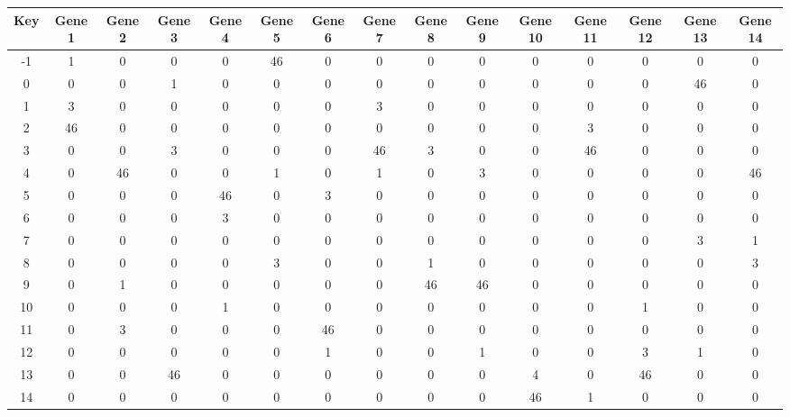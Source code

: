 \begin{tabular}{|c|c|c|c|c|c|c|c|c|c|c|c|c|c|c|}
\hline
Key & Gene 1 & Gene 2 & Gene 3 & Gene 4 & Gene 5 & Gene 6 & Gene 7 & Gene 8 & Gene 9 & Gene 10 & Gene 11 & Gene 12 & Gene 13 & Gene 14 \\
\hline
-1 & 1 & 0 & 0 & 0 & 46 & 0 & 0 & 0 & 0 & 0 & 0 & 0 & 0 & 0 \\
0 & 0 & 0 & 1 & 0 & 0 & 0 & 0 & 0 & 0 & 0 & 0 & 0 & 46 & 0 \\
1 & 3 & 0 & 0 & 0 & 0 & 0 & 3 & 0 & 0 & 0 & 0 & 0 & 0 & 0 \\
2 & 46 & 0 & 0 & 0 & 0 & 0 & 0 & 0 & 0 & 0 & 3 & 0 & 0 & 0 \\
3 & 0 & 0 & 3 & 0 & 0 & 0 & 46 & 3 & 0 & 0 & 46 & 0 & 0 & 0 \\
4 & 0 & 46 & 0 & 0 & 1 & 0 & 1 & 0 & 3 & 0 & 0 & 0 & 0 & 46 \\
5 & 0 & 0 & 0 & 46 & 0 & 3 & 0 & 0 & 0 & 0 & 0 & 0 & 0 & 0 \\
6 & 0 & 0 & 0 & 3 & 0 & 0 & 0 & 0 & 0 & 0 & 0 & 0 & 0 & 0 \\
7 & 0 & 0 & 0 & 0 & 0 & 0 & 0 & 0 & 0 & 0 & 0 & 0 & 3 & 1 \\
8 & 0 & 0 & 0 & 0 & 3 & 0 & 0 & 1 & 0 & 0 & 0 & 0 & 0 & 3 \\
9 & 0 & 1 & 0 & 0 & 0 & 0 & 0 & 46 & 46 & 0 & 0 & 0 & 0 & 0 \\
10 & 0 & 0 & 0 & 1 & 0 & 0 & 0 & 0 & 0 & 0 & 0 & 1 & 0 & 0 \\
11 & 0 & 3 & 0 & 0 & 0 & 46 & 0 & 0 & 0 & 0 & 0 & 0 & 0 & 0 \\
12 & 0 & 0 & 0 & 0 & 0 & 1 & 0 & 0 & 1 & 0 & 0 & 3 & 1 & 0 \\
13 & 0 & 0 & 46 & 0 & 0 & 0 & 0 & 0 & 0 & 4 & 0 & 46 & 0 & 0 \\
14 & 0 & 0 & 0 & 0 & 0 & 0 & 0 & 0 & 0 & 46 & 1 & 0 & 0 & 0 \\
\hline
\end{tabular}